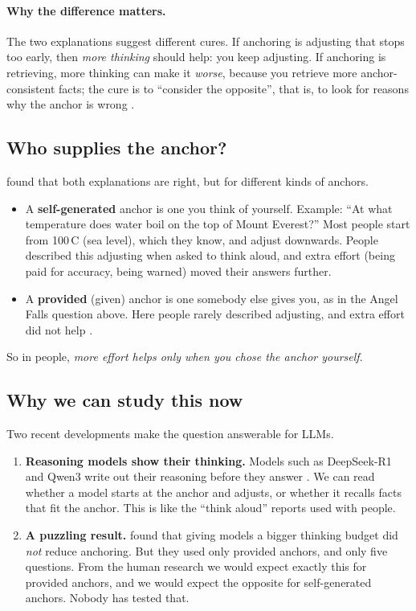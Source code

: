 \documentclass[11pt,a4paper]{article}
\begin{document}
\paragraph{Why the difference matters.} The two explanations suggest different cures. If anchoring is adjusting that stops too early, then \emph{more thinking} should help: you keep adjusting. If anchoring is retrieving, more thinking can make it \emph{worse}, because you retrieve more anchor-consistent facts; the cure is to ``consider the opposite'', that is, to look for reasons why the anchor is wrong \citep{mussweiler2000overcoming}.

\subsection{Who supplies the anchor?}
\label{sec:selfgiven}

\citet{epley2001putting} found that both explanations are right, but for different kinds of anchors.
\begin{itemize}
  \item A \textbf{self-generated} anchor is one you think of yourself. Example: ``At what temperature does water boil on the top of Mount Everest?'' Most people start from 100\,\textdegree C (sea level), which they know, and adjust downwards. People described this adjusting when asked to think aloud, and extra effort (being paid for accuracy, being warned) moved their answers further.
  \item A \textbf{provided} (given) anchor is one somebody else gives you, as in the Angel Falls question above. Here people rarely described adjusting, and extra effort did not help \citep{epley2005effortful}.
\end{itemize}
So in people, \emph{more effort helps only when you chose the anchor yourself}.

\subsection{Why we can study this now}

Two recent developments make the question answerable for LLMs.
\begin{enumerate}
  \item \textbf{Reasoning models show their thinking.} Models such as DeepSeek-R1 and Qwen3 write out their reasoning before they answer \citep{guo2025deepseek,yang2025qwen3}. We can read whether a model starts at the anchor and adjusts, or whether it recalls facts that fit the anchor. This is like the ``think aloud'' reports used with people.
  \item \textbf{A puzzling result.} \citet{kraishan2026long} found that giving models a bigger thinking budget did \emph{not} reduce anchoring. But they used only provided anchors, and only five questions. From the human research we would expect exactly this for provided anchors, and we would expect the opposite for self-generated anchors. Nobody has tested that.
\end{enumerate}
\end{document}
